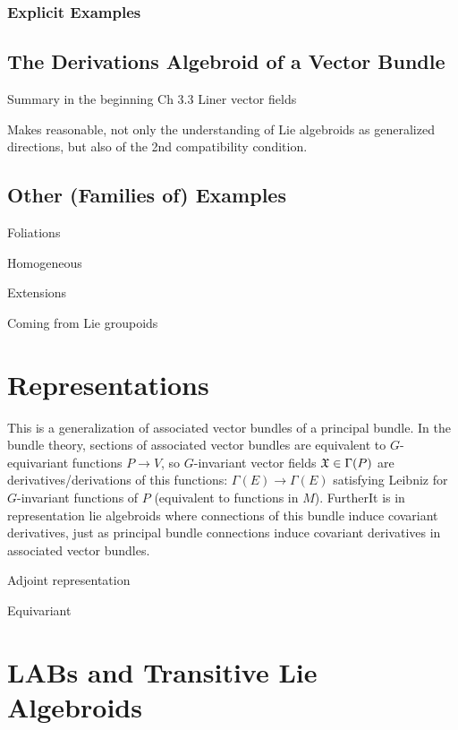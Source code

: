 \subsubsection{Explicit Examples}

\subsection{The Derivations Algebroid of a Vector Bundle}

Summary in the beginning Ch 3.3 Liner vector fields

Makes reasonable, not only the understanding of Lie algebroids as generalized directions, but also of the 2nd compatibility condition.

\subsection{Other (Families of) Examples}

Foliations

Homogeneous

Extensions

Coming from Lie groupoids

\section{Representations}

This is a generalization of associated vector bundles of a principal bundle. In the bundle theory, sections of associated vector bundles are equivalent to $G$-equivariant functions $P \to V$, so $G$-invariant vector fields $\mathfrak{X} \in \Gamma(P)$ are derivatives/derivations of this functions: $\Gamma(E) \to \Gamma(E)$ satisfying Leibniz for $G$-invariant functions of $P$ (equivalent to functions in $M$). FurtherIt is in representation lie algebroids where connections of this bundle induce covariant derivatives, just as principal bundle connections induce covariant derivatives in associated vector bundles.

Adjoint representation

Equivariant
\section{LABs and Transitive Lie Algebroids}

